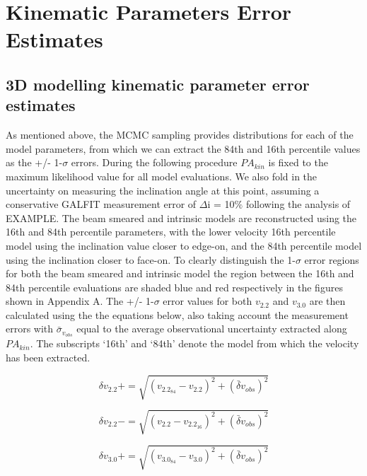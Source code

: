 \documentclass[fleqn,usenatbib]{mn2e}
\begin{document}
\section{Kinematic Parameters Error Estimates}\label{app:kin_error_estimates}

\subsection{3D modelling kinematic parameter error estimates}\label{appsubsec:model_errors}
As mentioned above, the MCMC sampling provides distributions for each of the model parameters, from which we can extract the 84th and 16th percentile values as the +/- 1-$\sigma$ errors.
During the following procedure $PA_{kin}$ is fixed to the maximum likelihood value for all model evaluations.
We also fold in the uncertainty on measuring the inclination angle at this point, assuming a conservative GALFIT measurement error of $\Delta$i = 10$\%$ following the analysis of EXAMPLE. 
The beam smeared and intrinsic models are reconstructed using the 16th and 84th percentile parameters, with the lower velocity 16th percentile model using the inclination value closer to edge-on, and the 84th percentile model using the inclination closer to face-on.
To clearly distinguish the 1-$\sigma$ error regions for both the beam smeared and intrinsic model the region between the 16th and 84th percentile evaluations are shaded blue and red respectively in the figures shown in Appendix A.
The +/- 1-$\sigma$ error values for both $v_{2.2}$ and $v_{3.0}$ are then calculated using the the equations below, also taking account the measurement errors with $\bar{\sigma}_{v_{obs}}$ equal to the average observational uncertainty extracted along $PA_{kin}$.
The subscripts `16th' and `84th' denote the model from which the velocity has been extracted.

\begin{equation}\label{eq:v2.2_plus}
   \delta v_{2.2}+ = \sqrt{(v_{2.2_{84}} - v_{2.2})^{2} + (\bar{\delta}v_{obs})^{2}}
\end{equation}

\begin{equation}\label{eq:v2.2_minus}
   \delta v_{2.2}- = \sqrt{(v_{2.2} - v_{2.2_{16}})^{2}  + (\bar{\delta}v_{obs})^{2}}
\end{equation}

\begin{equation}\label{eq:v3.0_plus}
   \delta v_{3.0}+ = \sqrt{(v_{3.0_{84}} - v_{3.0})^{2} + (\bar{\delta}v_{obs})^{2}}
\end{equation}
\end{document}
